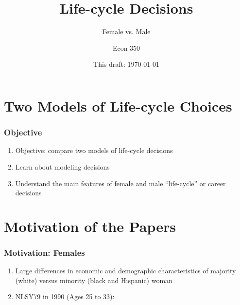 

\title{Life-cycle Decisions}
\subtitle{Female vs. Male}
\author{Econ 350}
\date{This draft: \today}




\begin{frame}[plain]
	\titlepage
\end{frame}



\section{Two Models of Life-cycle Choices}

\begin{frame}
	\frametitle{Objective}
		\begin{enumerate}
 			\item Objective: compare two models of life-cycle decisions
 			\item Learn about modeling decisions
 			\item Understand the main features of female and male ``life-cycle'' or career decisions
 		\end{enumerate}
\end{frame}

\section{Motivation of the Papers}
\begin{frame}
	\frametitle{Motivation: Females}
	\begin{enumerate}
		\item Large differences in economic and demographic characteristics of majority (white) versus minority (black and Hispanic) woman
		\item NLSY79 in 1990 (Ages 25 to 33):
	\end{enumerate}
\end{frame}


